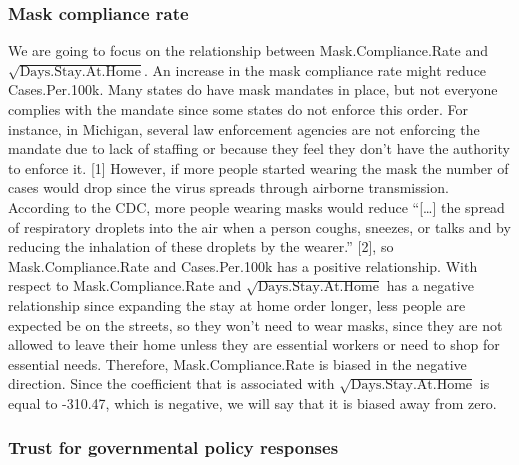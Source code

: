 \documentclass[
]{article}
\begin{document}
\hypertarget{mask-compliance-rate}{%
\subsubsection{Mask compliance rate}\label{mask-compliance-rate}}

We are going to focus on the relationship between Mask.Compliance.Rate
and \(\sqrt{\text{Days.Stay.At.Home}}\). An increase in the mask
compliance rate might reduce Cases.Per.100k. Many states do have mask
mandates in place, but not everyone complies with the mandate since some
states do not enforce this order. For instance, in Michigan, several law
enforcement agencies are not enforcing the mandate due to lack of
staffing or because they feel they don't have the authority to enforce
it. {[}1{]} However, if more people started wearing the mask the number
of cases would drop since the virus spreads through airborne
transmission. According to the CDC, more people wearing masks would
reduce ``{[}\ldots{]} the spread of respiratory droplets into the air
when a person coughs, sneezes, or talks and by reducing the inhalation
of these droplets by the wearer.'' {[}2{]}, so Mask.Compliance.Rate and
Cases.Per.100k has a positive relationship. With respect to
Mask.Compliance.Rate and \(\sqrt{\text{Days.Stay.At.Home}}\) has a
negative relationship since expanding the stay at home order longer,
less people are expected be on the streets, so they won't need to wear
masks, since they are not allowed to leave their home unless they are
essential workers or need to shop for essential needs. Therefore,
Mask.Compliance.Rate is biased in the negative direction. Since the
coefficient that is associated with \(\sqrt{\text{Days.Stay.At.Home}}\)
is equal to -310.47, which is negative, we will say that it is biased
away from zero.

\hypertarget{trust-for-governmental-policy-responses}{%
\subsubsection{Trust for governmental policy
responses}\label{trust-for-governmental-policy-responses}}
\end{document}
